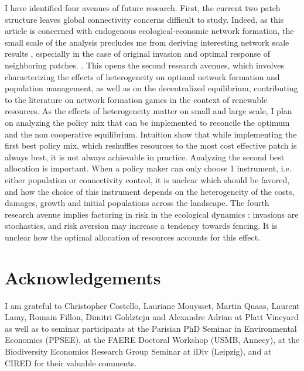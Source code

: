 I have identified four avenues of future research. First, the current two patch structure leaves global connectivity concerns difficult to study. Indeed, as this article is concerned with endogenous ecological-economic network formation, the small scale of the analysis precludes me from deriving interesting network scale results \citep{bode_using_2008}, especially in the case of original invasion and optimal response of neighboring patches. . This opens the second research avenues, which involves characterizing the effects of heterogeneity on optimal network formation and population management, as well as on the decentralized equilibrium, contributing to the literature on network formation games \citep{griffith_continuous_2022} in the context of renewable resources. As the effects of heterogeneity matter on small and large scale, I plan on analyzing the policy mix that can be implemented to reconcile the optimum and the non cooperative equilibrium. 
Intuition show that while implementing the first best policy mix, which reshuffles resources to the most cost effective patch is always best, it is not always achievable in practice. Analyzing the second best allocation is important. When a policy maker can only choose 1 instrument, i.e. either population or connectivity control, it is unclear which should be favored, and how the choice of this instrument depends on the heterogeneity of the costs, damages, growth and initial populations across the landscape. The fourth research avenue implies factoring in risk in the ecological dynamics : invasions are stochastics, and risk aversion may increase a tendency towards fencing. It is unclear how the optimal allocation of resources accounts for this effect. 

\section*{Acknowledgements}
I am grateful to Christopher Costello, Lauriane Mouysset, Martin Quaas, Laurent Lamy, Romain Fillon, Dimitri Goldztejn and Alexandre Adrian at Platt Vineyard as well as to seminar participants at the Parisian PhD Seminar in Environmental Economics (PPSEE), at the FAERE Doctoral Workshop (USMB, Annecy), at the Biodiversity Economics Research Group Seminar at iDiv (Leipzig), and at CIRED for their valuable comments.


\clearpage
{}
\setcounter{figure}{0}
\setcounter{table}{0}
\setcounter{equation}{0}
\renewcommand{\thesection}{\Alph{section}}
\renewcommand{\thesubsection}{\Alph{subsection}}
\renewcommand{\thefigure}{2.\Alph{figure}}
\renewcommand{\thetable}{2.\Alph{table}}




